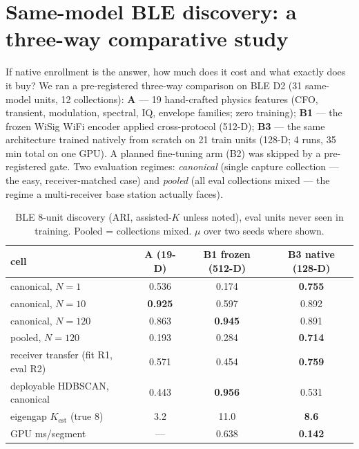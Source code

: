 \documentclass[conference]{IEEEtran}
\begin{document}
\section{Same-model BLE discovery: a three-way comparative study}
\label{sec:ble}

If native enrollment is the answer, how much does it cost and what exactly does it buy? We ran a
pre-registered three-way comparison on BLE D2 (31 same-model units, 12 collections):
\textbf{A} --- 19 hand-crafted physics features (CFO, transient, modulation, spectral, IQ,
envelope families; zero training); \textbf{B1} --- the frozen WiSig WiFi encoder applied
cross-protocol (512-D); \textbf{B3} --- the same architecture trained natively from scratch on 21
train units (128-D; 4 runs, 35 min total on one GPU). A planned fine-tuning arm (B2) was skipped
by a pre-registered gate. Two evaluation regimes: \emph{canonical} (single capture collection ---
the easy, receiver-matched case) and \emph{pooled} (all eval collections mixed --- the regime a
multi-receiver base station actually faces).

\begin{table}[t]
\caption{BLE 8-unit discovery (ARI, assisted-$K$ unless noted), eval units never seen in
training. Pooled = collections mixed. $\mu$ over two seeds where shown.}
\label{tab:ble}
\centering\small
\begin{tabular}{lccc}
\toprule
cell & A (19-D) & B1 frozen (512-D) & B3 native (128-D) \\
\midrule
canonical, $N{=}1$ & 0.536 & 0.174 & \textbf{0.755} \\
canonical, $N{=}10$ & \textbf{0.925} & 0.597 & 0.892 \\
canonical, $N{=}120$ & 0.863 & \textbf{0.945} & 0.891 \\
pooled, $N{=}120$ & 0.193 & 0.284 & \textbf{0.714} \\
receiver transfer (fit R1, eval R2) & 0.571 & 0.454 & \textbf{0.759} \\
deployable HDBSCAN, canonical & 0.443 & \textbf{0.956} & 0.531 \\
eigengap $K_{\mathrm{est}}$ (true 8) & 3.2 & 11.0 & \textbf{8.6} \\
GPU ms/segment & --- & 0.638 & \textbf{0.142} \\
\bottomrule
\end{tabular}
\end{table}
\end{document}

